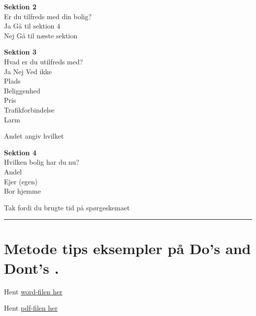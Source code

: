 \documentclass[
]{book}
\begin{document}
\textbf{Sektion 2}\\
Er du tilfreds med din bolig?\\
Ja Gå til sektion 4\\
Nej Gå til næste sektion

\textbf{Sektion 3}\\
Hvad er du utilfreds med?\\
Ja Nej Ved ikke\\
Plads\\
Beliggenhed\\
Pris\\
Trafikforbindelse\\
Larm

Andet angiv hvilket

\textbf{Sektion 4}\\
Hvilken bolig har du nu?\\
Andel\\
Ejer (egen)\\
Bor hjemme

Tak fordi du brugte tid på spørgeskemaet

\begin{center}\rule{0.5\linewidth}{0.5pt}\end{center}

\hypertarget{metode-tips-eksempler-puxe5-dos-and-donts-.}{%
\section{Metode tips eksempler på Do's and Dont's .}\label{metode-tips-eksempler-puxe5-dos-and-donts-.}}

Hent \href{./filer/metodetips.docx}{word-filen her}

Hent \href{./filer/metodetips.pdf}{pdf-filen her}

  
\end{document}
